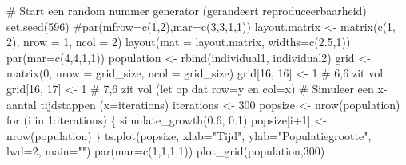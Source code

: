 \documentclass[
  a4paper,
]{scrbook}
\newenvironment{Shaded}{\begin{snugshade}}{\end{snugshade}}
\newcommand{\AttributeTok}[1]{\textcolor[rgb]{0.40,0.45,0.13}{#1}}
\newcommand{\CommentTok}[1]{\textcolor[rgb]{0.37,0.37,0.37}{#1}}
\newcommand{\ControlFlowTok}[1]{\textcolor[rgb]{0.00,0.23,0.31}{#1}}
\newcommand{\DecValTok}[1]{\textcolor[rgb]{0.68,0.00,0.00}{#1}}
\newcommand{\FloatTok}[1]{\textcolor[rgb]{0.68,0.00,0.00}{#1}}
\newcommand{\FunctionTok}[1]{\textcolor[rgb]{0.28,0.35,0.67}{#1}}
\newcommand{\NormalTok}[1]{\textcolor[rgb]{0.00,0.23,0.31}{#1}}
\newcommand{\OtherTok}[1]{\textcolor[rgb]{0.00,0.23,0.31}{#1}}
\newcommand{\SpecialCharTok}[1]{\textcolor[rgb]{0.37,0.37,0.37}{#1}}
\newcommand{\StringTok}[1]{\textcolor[rgb]{0.13,0.47,0.30}{#1}}
\theoremstyle{definition}
\theoremstyle{remark}
\begin{document}
\begin{Shaded}
\begin{Highlighting}[]
\CommentTok{\# Start een random nummer generator (gerandeert reproduceerbaarheid)}
\FunctionTok{set.seed}\NormalTok{(}\DecValTok{596}\NormalTok{)}
\CommentTok{\#par(mfrow=c(1,2),mar=c(3,3,1,1))}
\NormalTok{layout.matrix }\OtherTok{\textless{}{-}} \FunctionTok{matrix}\NormalTok{(}\FunctionTok{c}\NormalTok{(}\DecValTok{1}\NormalTok{, }\DecValTok{2}\NormalTok{), }\AttributeTok{nrow =} \DecValTok{1}\NormalTok{, }\AttributeTok{ncol =} \DecValTok{2}\NormalTok{)}
\FunctionTok{layout}\NormalTok{(}\AttributeTok{mat =}\NormalTok{ layout.matrix, }\AttributeTok{widths=}\FunctionTok{c}\NormalTok{(}\FloatTok{2.5}\NormalTok{,}\DecValTok{1}\NormalTok{))}
\FunctionTok{par}\NormalTok{(}\AttributeTok{mar=}\FunctionTok{c}\NormalTok{(}\DecValTok{4}\NormalTok{,}\DecValTok{4}\NormalTok{,}\DecValTok{1}\NormalTok{,}\DecValTok{1}\NormalTok{))}
\NormalTok{population }\OtherTok{\textless{}{-}} \FunctionTok{rbind}\NormalTok{(individual1, individual2)}
\NormalTok{grid }\OtherTok{\textless{}{-}} \FunctionTok{matrix}\NormalTok{(}\DecValTok{0}\NormalTok{, }\AttributeTok{nrow =}\NormalTok{ grid\_size, }\AttributeTok{ncol =}\NormalTok{ grid\_size)}
\NormalTok{grid[}\DecValTok{16}\NormalTok{, }\DecValTok{16}\NormalTok{] }\OtherTok{\textless{}{-}} \DecValTok{1} \CommentTok{\# 6,6 zit vol}
\NormalTok{grid[}\DecValTok{16}\NormalTok{, }\DecValTok{17}\NormalTok{] }\OtherTok{\textless{}{-}} \DecValTok{1} \CommentTok{\# 7,6 zit vol (let op dat row=y en col=x)}
\CommentTok{\# Simuleer een x{-}aantal tijdstappen (x=iterations)}
\NormalTok{iterations }\OtherTok{\textless{}{-}} \DecValTok{300}
\NormalTok{popsize }\OtherTok{\textless{}{-}} \FunctionTok{nrow}\NormalTok{(population)}
\ControlFlowTok{for}\NormalTok{ (i }\ControlFlowTok{in} \DecValTok{1}\SpecialCharTok{:}\NormalTok{iterations) \{}
  \FunctionTok{simulate\_growth}\NormalTok{(}\FloatTok{0.6}\NormalTok{, }\FloatTok{0.1}\NormalTok{)}
\NormalTok{  popsize[i}\SpecialCharTok{+}\DecValTok{1}\NormalTok{] }\OtherTok{\textless{}{-}} \FunctionTok{nrow}\NormalTok{(population)}
\NormalTok{\}}
\FunctionTok{ts.plot}\NormalTok{(popsize, }\AttributeTok{xlab=}\StringTok{"Tijd"}\NormalTok{, }\AttributeTok{ylab=}\StringTok{"Populatiegrootte"}\NormalTok{, }\AttributeTok{lwd=}\DecValTok{2}\NormalTok{, }\AttributeTok{main=}\StringTok{""}\NormalTok{)}
\FunctionTok{par}\NormalTok{(}\AttributeTok{mar=}\FunctionTok{c}\NormalTok{(}\DecValTok{1}\NormalTok{,}\DecValTok{1}\NormalTok{,}\DecValTok{1}\NormalTok{,}\DecValTok{1}\NormalTok{))}
\FunctionTok{plot\_grid}\NormalTok{(population,}\DecValTok{300}\NormalTok{)}


\end{Highlighting}
\end{Shaded}
\end{document}

